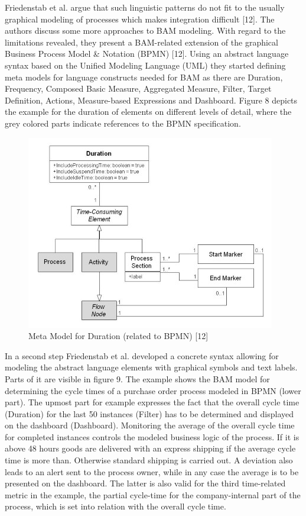 Friedenstab et al. argue that such linguistic patterns do not fit to the usually graphical modeling of processes which makes integration difficult [12]. The authors discuss some more approaches to BAM modeling. With regard to the limitations revealed, they present a BAM-related extension of the graphical Business Process Model & Notation (BPMN) [12].
Using an abstract language syntax based on the Unified Modeling Language (UML) they started defining meta models for language constructs needed for BAM as there are Duration, Frequency, Composed Basic Measure, Aggregated Measure, Filter, Target Definition, Actions, Measure-based Expressions and Dashboard. Figure 8 depicts the example for the duration of elements on different levels of detail, where the grey colored parts indicate references to the BPMN specification.

\begin{figure}[h]
	\centering
	\includegraphics[width=0.9\linewidth]{Figures/Chapter5/Meta-Mode-fo-Duration-relate-to-BPMN-1.jpg}
	\caption[Meta Model for Duration (related to BPMN) 12]{Meta Model for Duration (related to BPMN) [12]}
	\label{fig:Meta-Model}
\end{figure}


In a second step Friedenstab et al. developed a concrete syntax allowing for modeling the abstract language elements with graphical symbols and text labels. Parts of it are visible in figure 9. The example shows the BAM model for determining the cycle times of a purchase order process modeled in BPMN (lower part). The upmost part for example expresses the fact that the overall cycle time (Duration) for the last 50 instances (Filter) has to be determined and displayed on the dashboard (Dashboard). Monitoring the average of the overall cycle time for completed instances controls the modeled business logic of the process. If it is above 48 hours goods are delivered with an express shipping if the average cycle time is more than. Otherwise standard shipping is carried out. A deviation also leads to an alert sent to the process owner, while in any case the average is to be presented on the dashboard. The latter is also valid for the third time-related metric in the example, the partial cycle-time for the company-internal part of the process, which is set into relation with the overall cycle time.

